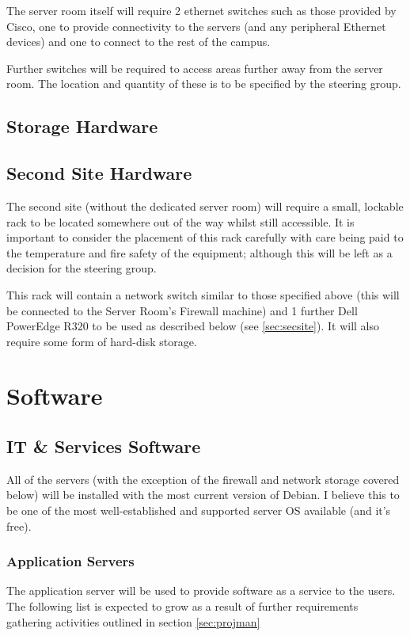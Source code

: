 \documentclass[a4paper, twoside]{article}
\begin{document}
The server room itself will require 2 ethernet switches such as those
provided by Cisco, one to provide connectivity to the servers (and any
peripheral Ethernet devices) and one to connect to the rest of the campus.

Further switches will be required to access areas further away from the server
room. The location and quantity of these is to be specified by the steering
group.

\subsection{Storage Hardware}

\subsection{Second Site Hardware}
The second site (without the dedicated server room) will require a small,
lockable rack to be located somewhere out of the way whilst still accessible.
It is important to consider the placement of this rack carefully with care being
paid to the temperature and fire safety of the equipment; although this will be
left as a decision for the steering group.

This rack will contain a network switch similar to those specified above (this
will be connected to the Server Room's Firewall machine) and 1 further Dell
PowerEdge R320 to be used as described below (see \ref{sec:secsite}). It will
also require some form of hard-disk storage. %

\section{Software}
\subsection{IT \& Services Software}
All of the servers (with the exception of the firewall and network storage covered below) will be installed with the most current version of Debian. I
believe this to be one of the most well-established and supported server OS
available (and it's free).

\subsubsection{Application Servers}
The application server will be used to provide software as a service to the
users. The following list is expected to grow as a result of further
requirements gathering activities outlined in section \ref{sec:projman}
\end{document}
